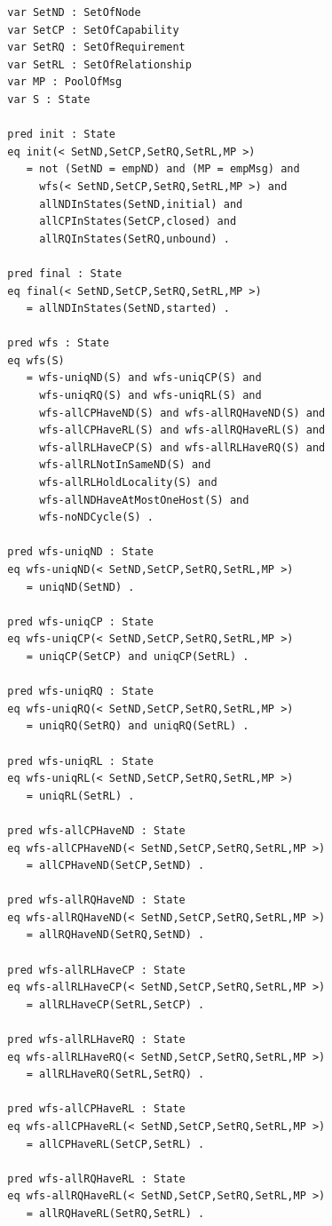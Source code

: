 \documentclass[12pt]{report}
\begin{document}
\begin{verbatim}
  var SetND : SetOfNode
  var SetCP : SetOfCapability
  var SetRQ : SetOfRequirement
  var SetRL : SetOfRelationship
  var MP : PoolOfMsg
  var S : State

  pred init : State
  eq init(< SetND,SetCP,SetRQ,SetRL,MP >)
     = not (SetND = empND) and (MP = empMsg) and
       wfs(< SetND,SetCP,SetRQ,SetRL,MP >) and
       allNDInStates(SetND,initial) and 
       allCPInStates(SetCP,closed) and 
       allRQInStates(SetRQ,unbound) .

  pred final : State
  eq final(< SetND,SetCP,SetRQ,SetRL,MP >)
     = allNDInStates(SetND,started) .

  pred wfs : State
  eq wfs(S)
     = wfs-uniqND(S) and wfs-uniqCP(S) and 
       wfs-uniqRQ(S) and wfs-uniqRL(S) and
       wfs-allCPHaveND(S) and wfs-allRQHaveND(S) and 
       wfs-allCPHaveRL(S) and wfs-allRQHaveRL(S) and 
       wfs-allRLHaveCP(S) and wfs-allRLHaveRQ(S) and 
       wfs-allRLNotInSameND(S) and
       wfs-allRLHoldLocality(S) and
       wfs-allNDHaveAtMostOneHost(S) and
       wfs-noNDCycle(S) .

  pred wfs-uniqND : State
  eq wfs-uniqND(< SetND,SetCP,SetRQ,SetRL,MP >)
     = uniqND(SetND) .

  pred wfs-uniqCP : State
  eq wfs-uniqCP(< SetND,SetCP,SetRQ,SetRL,MP >)
     = uniqCP(SetCP) and uniqCP(SetRL) .

  pred wfs-uniqRQ : State
  eq wfs-uniqRQ(< SetND,SetCP,SetRQ,SetRL,MP >)
     = uniqRQ(SetRQ) and uniqRQ(SetRL) .

  pred wfs-uniqRL : State
  eq wfs-uniqRL(< SetND,SetCP,SetRQ,SetRL,MP >)
     = uniqRL(SetRL) .

  pred wfs-allCPHaveND : State
  eq wfs-allCPHaveND(< SetND,SetCP,SetRQ,SetRL,MP >)
     = allCPHaveND(SetCP,SetND) .

  pred wfs-allRQHaveND : State
  eq wfs-allRQHaveND(< SetND,SetCP,SetRQ,SetRL,MP >)
     = allRQHaveND(SetRQ,SetND) .

  pred wfs-allRLHaveCP : State
  eq wfs-allRLHaveCP(< SetND,SetCP,SetRQ,SetRL,MP >)
     = allRLHaveCP(SetRL,SetCP) .

  pred wfs-allRLHaveRQ : State
  eq wfs-allRLHaveRQ(< SetND,SetCP,SetRQ,SetRL,MP >)
     = allRLHaveRQ(SetRL,SetRQ) .

  pred wfs-allCPHaveRL : State
  eq wfs-allCPHaveRL(< SetND,SetCP,SetRQ,SetRL,MP >)
     = allCPHaveRL(SetCP,SetRL) .

  pred wfs-allRQHaveRL : State
  eq wfs-allRQHaveRL(< SetND,SetCP,SetRQ,SetRL,MP >)
     = allRQHaveRL(SetRQ,SetRL) .


\end{verbatim}
\end{document}
